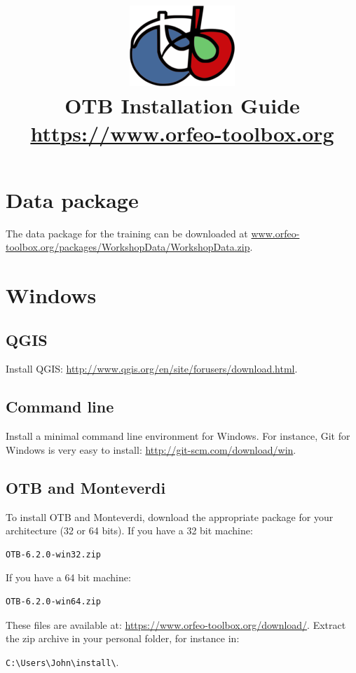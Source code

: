 \documentclass[10pt,a4paper]{article}
\title{\includegraphics[scale=1]{Art/otb-logo.png}\\
  OTB Installation Guide\\
  {\small\url{https://www.orfeo-toolbox.org}}
}
\begin{document}
\maketitle

\tableofcontents

\clearpage
\section{Data package}

The data package for the training can be downloaded at \url{www.orfeo-toolbox.org/packages/WorkshopData/WorkshopData.zip}.

\section{Windows}

\subsection{QGIS}
Install QGIS: \url{http://www.qgis.org/en/site/forusers/download.html}.

\subsection{Command line}
Install a minimal command line environment for Windows. For instance, Git for Windows is very easy to install:
\url{http://git-scm.com/download/win}.

\subsection{OTB and Monteverdi}
To install OTB and Monteverdi, download the appropriate package for your architecture (32 or 64 bits). If you have a 32 bit machine:

\begin{verbatim}
OTB-6.2.0-win32.zip
\end{verbatim}

If you have a 64 bit machine:

\begin{verbatim}
OTB-6.2.0-win64.zip
\end{verbatim}

These files are available at:
\url{https://www.orfeo-toolbox.org/download/}.
Extract the zip archive in your personal folder, for instance in:\\
\begin{centering}
\texttt{C:{\textbackslash}Users{\textbackslash}John{\textbackslash}install{\textbackslash}}.
\end{centering}
\end{document}
